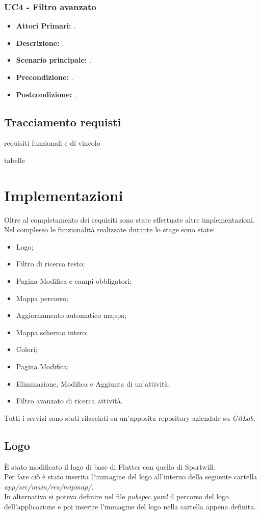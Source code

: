 \subsubsection{ UC4 - Filtro avanzato}
\begin{itemize}
	\item\textbf{Attori Primari:} .
	\item\textbf{Descrizione:} .
	\item\textbf{Scenario principale:} .
	\item\textbf{Precondizione:} .
	\item\textbf{Postcondizione:} .
\end{itemize}

\newpage

\subsection{Tracciamento requisti}
requisiti funzionali e di vincolo

tabelle

\newpage

\section{Implementazioni}
Oltre al completamento dei requisiti sono state effettuate altre implementazioni.\\
Nel complesso le funzionalità realizzate durante lo stage sono state: 
\begin{itemize}
	\item Logo;
	\item Filtro di ricerca testo;
	\item Pagina Modifica e campi obbligatori;
	\item Mappa percorso;
	\item Aggiornamento automatico mappa;
	\item Mappa schermo intero;
	\item Colori;
	\item Pagina Modifica;
	\item Eliminazione, Modifica e Aggiunta di un'attività;
	\item Filtro avanzato di ricerca attività.
\end{itemize}
Tutti i servizi sono stati rilasciati su un'apposita repository aziendale su \textit{GitLab}.

\subsection{Logo}
È stato modificato il logo di base di Flutter con quello di Sportwill.\\
Per  fare ciò è stato inserita l'immagine del logo all'interno della seguente cartella \textit{app/src/main/res/mipmap/}.\\
In alternativa si poteva definire nel file \textit{pubspec.yaml} il percorso del logo dell'applicazione e poi inserire l'immagine del logo nella cartella appena definita.\\

